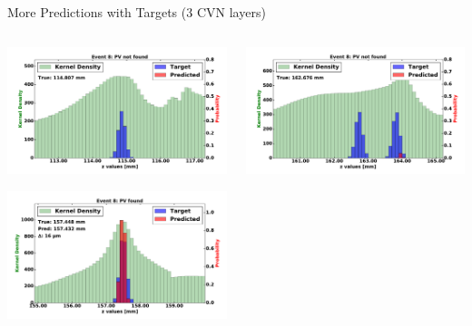 \begin{frame}{More Predictions with Targets (3 CVN layers)}
  \begin{columns}[c]
        \begin{center}
            \includegraphics[width=1\textwidth,height=0.45\textwidth, trim=18 0 18 0]{images/120000_3layer_49.pdf}
    
            \includegraphics[width=1\textwidth, height=0.45\textwidth,trim=18 0 18 0]{images/120000_3layer_50.pdf}

        \end{center}
        \begin{center}
           \includegraphics[width=1\textwidth, height=0.45\textwidth, trim=18 0 18 0]{images/120000_3layer_51.pdf}
    

\end{center}
\end{columns}
\end{frame}
